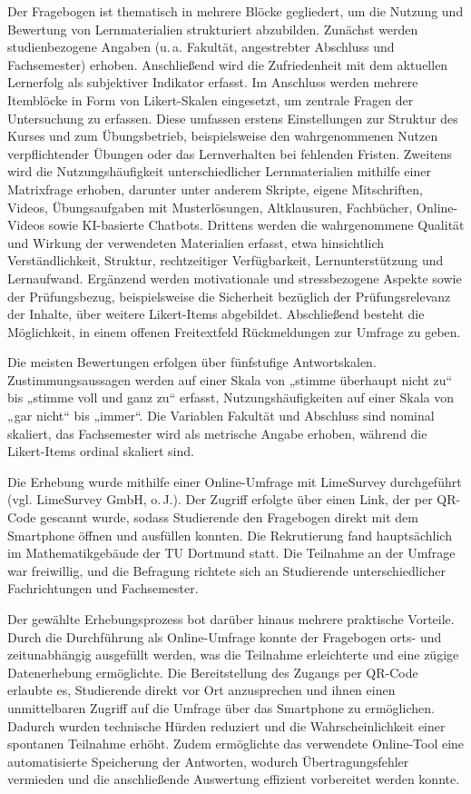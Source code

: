 \documentclass[a4paper,12pt]{article}
\begin{document}
Der Fragebogen ist thematisch in mehrere Blöcke gegliedert, um die Nutzung und Bewertung von Lernmaterialien strukturiert abzubilden. Zunächst werden studienbezogene Angaben (u.\,a. Fakultät, angestrebter Abschluss und Fachsemester) erhoben. Anschließend wird die Zufriedenheit mit dem aktuellen Lernerfolg als subjektiver Indikator erfasst. Im Anschluss werden mehrere Itemblöcke in Form von Likert-Skalen eingesetzt, um zentrale Fragen der Untersuchung zu erfassen. Diese umfassen erstens Einstellungen zur Struktur des Kurses und zum Übungsbetrieb, beispielsweise den wahrgenommenen Nutzen verpflichtender Übungen oder das Lernverhalten bei fehlenden Fristen. Zweitens wird die Nutzungshäufigkeit unterschiedlicher Lernmaterialien mithilfe einer Matrixfrage erhoben, darunter unter anderem Skripte, eigene Mitschriften, Videos, Übungsaufgaben mit Musterlösungen, Altklausuren, Fachbücher, Online-Videos sowie KI-basierte Chatbots. Drittens werden die wahrgenommene Qualität und Wirkung der verwendeten Materialien erfasst, etwa hinsichtlich Verständlichkeit, Struktur, rechtzeitiger Verfügbarkeit, Lernunterstützung und Lernaufwand. Ergänzend werden motivationale und stressbezogene Aspekte sowie der Prüfungsbezug, beispielsweise die Sicherheit bezüglich der Prüfungsrelevanz der Inhalte, über weitere Likert-Items abgebildet. Abschließend besteht die Möglichkeit, in einem offenen Freitextfeld Rückmeldungen zur Umfrage zu geben.

Die meisten Bewertungen erfolgen über fünfstufige Antwortskalen. Zustimmungsaussagen werden auf einer Skala von „stimme überhaupt nicht zu“ bis „stimme voll und ganz zu“ erfasst, Nutzungshäufigkeiten auf einer Skala von „gar nicht“ bis „immer“. Die Variablen Fakultät und Abschluss sind nominal skaliert, das Fachsemester wird als metrische Angabe erhoben, während die Likert-Items ordinal skaliert sind.

Die Erhebung wurde mithilfe einer Online-Umfrage mit LimeSurvey durchgeführt (vgl. LimeSurvey GmbH, o.\,J.). Der Zugriff erfolgte über einen Link, der per QR-Code gescannt wurde, sodass Studierende den Fragebogen direkt mit dem Smartphone öffnen und ausfüllen konnten. Die Rekrutierung fand hauptsächlich im Mathematikgebäude der TU Dortmund statt. Die Teilnahme an der Umfrage war freiwillig, und die Befragung richtete sich an Studierende unterschiedlicher Fachrichtungen und Fachsemester.

Der gewählte Erhebungsprozess bot darüber hinaus mehrere praktische Vorteile. Durch die Durchführung als Online-Umfrage konnte der Fragebogen orts- und zeitunabhängig ausgefüllt werden, was die Teilnahme erleichterte und eine zügige Datenerhebung ermöglichte. Die Bereitstellung des Zugangs per QR-Code erlaubte es, Studierende direkt vor Ort anzusprechen und ihnen einen unmittelbaren Zugriff auf die Umfrage über das Smartphone zu ermöglichen. Dadurch wurden technische Hürden reduziert und die Wahrscheinlichkeit einer spontanen Teilnahme erhöht. Zudem ermöglichte das verwendete Online-Tool eine automatisierte Speicherung der Antworten, wodurch Übertragungsfehler vermieden und die anschließende Auswertung effizient vorbereitet werden konnte. 
\end{document}
